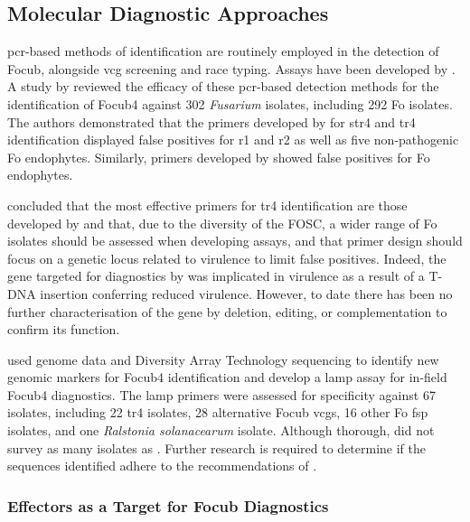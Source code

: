 \subsection{Molecular Diagnostic Approaches}
\Ac{pcr}-based methods of identification are routinely employed in the detection of \ac{Focub}, alongside \ac{vcg} screening and race typing. Assays have been developed by \textcite{Lin2009, Dita2010, Li2013a, Li2013b}. A study by \textcite{Magdama2019} reviewed the efficacy of these \ac{pcr}-based detection methods for the identification of \ac{Focub4} against 302 \textit{Fusarium} isolates, including 292 \ac{Fo} isolates. The authors demonstrated that the primers developed by \textcite{Lin2009, Li2013a} for \ac{str4} and \ac{tr4} identification displayed false positives for \ac{r1} and \ac{r2} as well as five non-pathogenic \ac{Fo} endophytes. Similarly, primers developed by \textcite{Dita2010} showed false positives for \ac{Fo} endophytes. 

\textcite{Magdama2019} concluded that the most effective primers for \ac{tr4} identification are those developed by \textcite {Li2013b} and that, due to the diversity of the \ac{FOSC}, a wider range of \ac{Fo} isolates should be assessed when developing assays, and that primer design should focus on a genetic locus related to virulence to limit false positives.  Indeed, the gene targeted for diagnostics by \textcite {Li2013b} was implicated in virulence as a result of a T-DNA insertion conferring reduced virulence. However, to date there has been  no further characterisation of the gene by deletion, editing, or complementation to confirm its function.  

\textcite{Ordonez2019} used genome data and Diversity Array Technology sequencing to identify new genomic markers for \ac{Focub4} identification and develop a \ac{lamp} assay for in-field \ac{Focub4} diagnostics. The \ac{lamp} primers were assessed for specificity against 67 isolates, including 22 \ac{tr4} isolates, 28 alternative \ac{Focub} \acp{vcg}, 16 other \ac{Fo} \ac{fsp} isolates, and one \textit{Ralstonia solanacearum} isolate. Although thorough, \textcite{Ordonez2019}  did not survey as many isolates as \textcite{Magdama2019}. Further research is required to determine if the sequences identified adhere to the recommendations of \textcite{Magdama2019}. 

\subsubsection{Effectors as a Target for \acl{Focub} Diagnostics}

